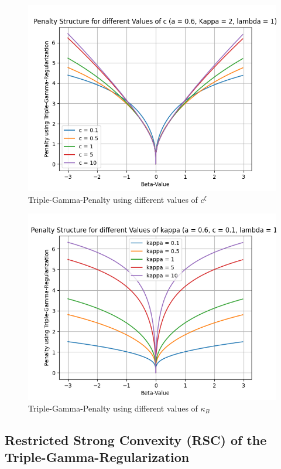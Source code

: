 \documentclass[12pt,a4paper]{article}
\begin{document}
\begin{figure}[!h]
\centering
\includegraphics[scale=0.75]{../02_simulation/021_simulation_figures/TGPenalty_ChangeInC.png}
\caption{Triple-Gamma-Penalty using different values of $c^\xi$}
\label{fig:basicTGPen}
\end{figure}

\begin{figure}[!h]
\centering
\includegraphics[scale=0.75]{../02_simulation/021_simulation_figures/TGPenalty_ChangeInKappa.png}
\caption{Triple-Gamma-Penalty using different values of $\kappa_B$}
\label{fig:basicTGPen}
\end{figure}

\subsection{Restricted Strong Convexity (RSC) of the Triple-Gamma-Regularization}
\end{document}
